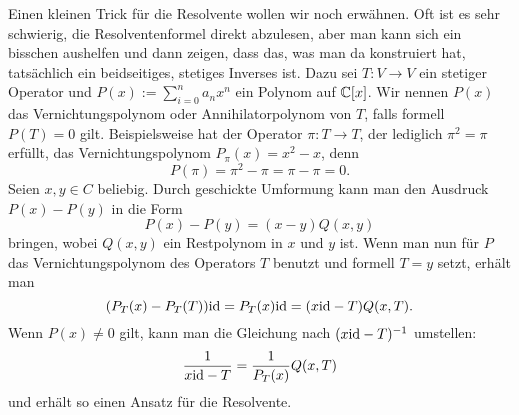 Einen kleinen Trick für die Resolvente wollen wir noch erwähnen. Oft ist es sehr schwierig, die Resolventenformel direkt abzulesen, aber man kann sich  ein bisschen aushelfen und dann zeigen, dass das, was man da konstruiert hat, tatsächlich ein beidseitiges, stetiges Inverses ist. Dazu sei $T: V \to V$ ein stetiger Operator und $P(x):= \sum_{i=0}^n a_n x^n$ ein Polynom auf $\mathbb{C}[x]$. Wir nennen $P(x)$ das Vernichtungspolynom oder Annihilatorpolynom von $T$, falls formell $P(T)=0$ gilt. Beispielsweise hat der Operator $\pi: T \to T$, der lediglich $\pi^2=\pi$ erfüllt, das Vernichtungspolynom $P_\pi(x)=x^2-x$, denn
\[
	P(\pi) = \pi^2 - \pi = \pi - \pi = 0.
\]
Seien $x,y \in C$ beliebig. Durch geschickte Umformung kann man den Ausdruck $P(x) - P(y)$ in die Form
\[
	P(x) - P(y) = (x-y) Q(x,y)
\]
bringen, wobei $Q(x,y)$ ein Restpolynom in $x$ und $y$ ist. Wenn man nun für $P$ das Vernichtungspolynom des Operators $T$ benutzt und formell $T=y$ setzt, erhält man
\[
	(P_T(x) - P_T(T))\text{id} = P_T(x)\text{id} = (x \text{id} - T) Q(x,T).
\]
Wenn $P(x)\neq 0$ gilt, kann man die Gleichung nach $(x \text{id} - T)^{-1}$ umstellen:
\[
	\frac{1}{x \text{id} - T} = \frac{1}{P_T(x)}Q(x,T)
\]
und erhält so einen Ansatz für die Resolvente.